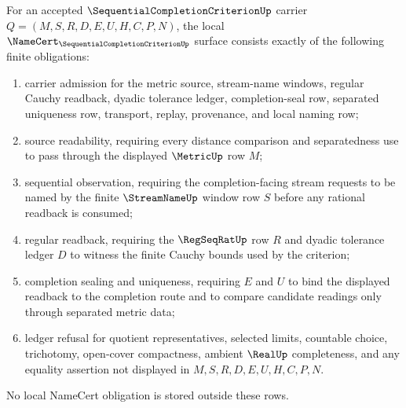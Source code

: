 \begin{theorem}\label{thm:sequential-completion-criterion-namecert-obligations}
For an accepted $\SequentialCompletionCriterionUp$ carrier $Q=(M,S,R,D,E,U,H,C,P,N)$, the local $\NameCert_{\SequentialCompletionCriterionUp}$ surface consists exactly of the following finite obligations:
\begin{enumerate}
\item carrier admission for the metric source, stream-name windows, regular Cauchy readback, dyadic tolerance ledger, completion-seal row, separated uniqueness row, transport, replay, provenance, and local naming row;
\item source readability, requiring every distance comparison and separatedness use to pass through the displayed $\MetricUp$ row $M$;
\item sequential observation, requiring the completion-facing stream requests to be named by the finite $\StreamNameUp$ window row $S$ before any rational readback is consumed;
\item regular readback, requiring the $\RegSeqRatUp$ row $R$ and dyadic tolerance ledger $D$ to witness the finite Cauchy bounds used by the criterion;
\item completion sealing and uniqueness, requiring $E$ and $U$ to bind the displayed readback to the completion route and to compare candidate readings only through separated metric data;
\item ledger refusal for quotient representatives, selected limits, countable choice, trichotomy, open-cover compactness, ambient $\RealUp$ completeness, and any equality assertion not displayed in $M,S,R,D,E,U,H,C,P,N$.
\end{enumerate}
No local NameCert obligation is stored outside these rows.
\end{theorem}

